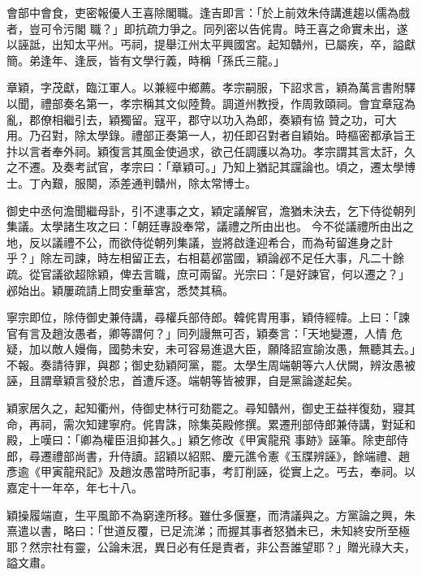 \begin{pinyinscope}
 會部中會食，吏密報優人王喜除閣職。逢吉即言：「於上前效朱侍講進趨以儒為戲者，豈可令污閣
 職？」即抗疏力爭之。同列密以告侂胄。時王喜之命實未出，遂以誣詆，出知太平州。丐祠，提舉江州太平興國宮。起知贛州，已屬疾，卒，謚獻簡。弟逢年、逢辰，皆有文學行義，時稱「孫氏三龍。」



 章穎，字茂獻，臨江軍人。以兼經中鄉薦。孝宗嗣服，下詔求言，穎為萬言書附驛以聞，禮部奏名第一，孝宗稱其文似陸贄。調道州教授，作周敦頤祠。會宜章寇為亂，郡僚相繼引去，穎獨留。寇平，郡守以功入為郎，奏穎有協
 贊之功，可大用。乃召對，除太學錄。禮部正奏第一人，初任即召對者自穎始。時樞密都承旨王抃以言者奉外祠。穎復言其風金使過求，欲己任調護以為功。孝宗謂其言太訐，久之不遷。及奏考試官，孝宗曰：「章穎可。」乃知上猶記其讜論也。頃之，遷太學博士。丁內艱，服闋，添差通判贛州，除太常博士。



 御史中丞何澹聞繼母訃，引不逮事之文，穎定議解官，澹猶未決去，乞下侍從朝列集議。太學諸生攻之曰：「朝廷專設奉常，議禮之所由出也。
 今不從議禮所由出之地，反以議禮不公，而欲侍從朝列集議，豈將啟逢迎希合，而為茍留進身之計乎？」除左司諫，時左相留正去，右相葛邲當國，穎論邲不足任大事，凡二十餘疏。從官議欲超除穎，俾去言職，庶可兩留。光宗曰：「是好諫官，何以遷之？」邲始出。穎屢疏請上問安重華宮，悉焚其稿。



 寧宗即位，除侍御史兼侍講，尋權兵部侍郎。韓侂胄用事，穎侍經幃。上曰：「諫官有言及趙汝愚者，卿等謂何？」同列謾無可否，穎奏言：「天地變遷，人情
 危疑，加以敵人嫚侮，國勢未安，未可容易進退大臣，願降詔宣諭汝愚，無聽其去。」不報。奏請待罪，與郡；御史劾穎阿黨，罷。太學生周端朝等六人伏闕，辨汝愚被誣，且謂章穎言發於忠，首遭斥逐。端朝等皆被罪，自是黨論遂起矣。



 穎家居久之，起知衢州，侍御史林行可劾罷之。尋知贛州，御史王益祥復劾，寢其命，再祠，需次知建寧府。侂胄誅，除集英殿修撰。累遷刑部侍郎兼侍講，對延和殿，上嘆曰：「卿為權臣沮抑甚久。」穎乞修改《甲寅龍飛
 事跡》誣筆。除吏部侍郎，尋遷禮部尚書，升侍讀。詔穎以紹熙、慶元譙令憲《玉牒辨誣》，餘端禮、趙彥逾《甲寅龍飛記》及趙汝愚當時所記事，考訂削誣，從實上之。丐去，奉祠。以嘉定十一年卒，年七十八。



 穎操履端直，生平風節不為窮達所移。雖仕多偃蹇，而清議與之。方黨論之興，朱熹遣以書，略曰：「世道反覆，已足流涕；而握其事者怒猶未已，未知終安所至極耶？然宗社有靈，公論未泯，異日必有任是責者，非公吾誰望耶？」贈光祿大夫，謚文肅。




\end{pinyinscope}
